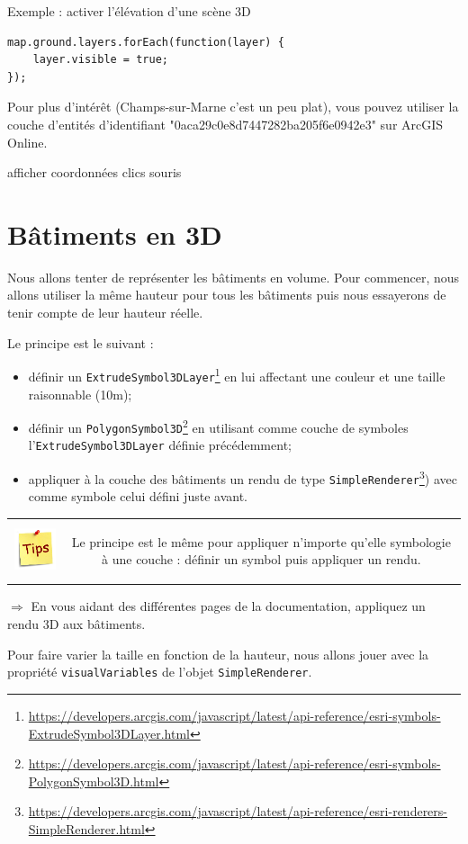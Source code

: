 \documentclass[11pt]{article}
\newcommand{\action}{$\Rightarrow$ }
\newenvironment{note}{%
	\begin{tabular}[t t]{c c}
		\includegraphics{img/tips.png}
		 &
		\begin{minipage}[c]{0.9\linewidth}
			\begin{sffamily}
}{%
			\end{sffamily}
		\end{minipage}
	\end{tabular}	
}
\newcommand{\code}[1]{\lstinline{#1}}
\begin{document}
Exemple : activer l'élévation d'une scène 3D

\begin{lstlisting}
map.ground.layers.forEach(function(layer) {
	layer.visible = true;
});
\end{lstlisting}

Pour plus d'intérêt (Champs-sur-Marne c'est un peu plat), vous pouvez utiliser la couche d'entités d'identifiant "0aca29c0e8d7447282ba205f6e0942e3" sur ArcGIS Online.


afficher coordonnées clics souris



\section{Bâtiments en 3D}
Nous allons tenter de représenter les bâtiments en volume. Pour commencer, nous allons utiliser la même hauteur pour tous les bâtiments puis nous essayerons de tenir compte de leur hauteur réelle.

Le principe est le suivant :
\begin{itemize}
	\item définir un \code{ExtrudeSymbol3DLayer}\footnote{\url{https://developers.arcgis.com/javascript/latest/api-reference/esri-symbols-ExtrudeSymbol3DLayer.html}} en lui affectant une couleur et une taille raisonnable (10m);
	\item définir un \code{PolygonSymbol3D}\footnote{\url{https://developers.arcgis.com/javascript/latest/api-reference/esri-symbols-PolygonSymbol3D.html}} en utilisant comme couche de symboles l'\code{ExtrudeSymbol3DLayer} définie précédemment;
	\item appliquer à la couche des bâtiments un rendu de type \code{SimpleRenderer}\footnote{\url{https://developers.arcgis.com/javascript/latest/api-reference/esri-renderers-SimpleRenderer.html}}) avec comme symbole celui défini juste avant.
\end{itemize}

\begin{note}
Le principe est le même pour appliquer n'importe qu'elle symbologie à une couche : définir un symbol puis appliquer un rendu. 
\end{note}

\action En vous aidant des différentes pages de la documentation, appliquez un rendu 3D aux bâtiments.

Pour faire varier la taille en fonction de la hauteur, nous allons jouer avec la propriété \code{visualVariables} de l'objet \code{SimpleRenderer}.
\end{document}
